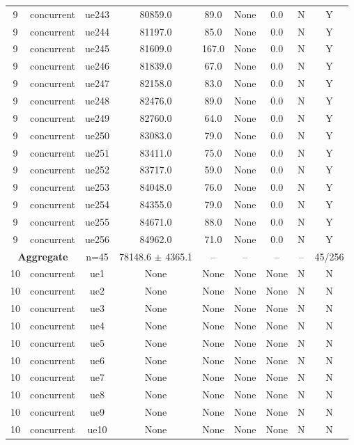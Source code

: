 \begin{table}[ht]
\begin{tabular}{|c|c|c|c|c|c|c|c|c|}
9 & concurrent & ue243 & 80859.0 & 89.0 & None & 0.0 & N & Y \\
9 & concurrent & ue244 & 81197.0 & 85.0 & None & 0.0 & N & Y \\
9 & concurrent & ue245 & 81609.0 & 167.0 & None & 0.0 & N & Y \\
9 & concurrent & ue246 & 81839.0 & 67.0 & None & 0.0 & N & Y \\
9 & concurrent & ue247 & 82158.0 & 83.0 & None & 0.0 & N & Y \\
9 & concurrent & ue248 & 82476.0 & 89.0 & None & 0.0 & N & Y \\
9 & concurrent & ue249 & 82760.0 & 64.0 & None & 0.0 & N & Y \\
9 & concurrent & ue250 & 83083.0 & 79.0 & None & 0.0 & N & Y \\
9 & concurrent & ue251 & 83411.0 & 75.0 & None & 0.0 & N & Y \\
9 & concurrent & ue252 & 83717.0 & 59.0 & None & 0.0 & N & Y \\
9 & concurrent & ue253 & 84048.0 & 76.0 & None & 0.0 & N & Y \\
9 & concurrent & ue254 & 84355.0 & 79.0 & None & 0.0 & N & Y \\
9 & concurrent & ue255 & 84671.0 & 88.0 & None & 0.0 & N & Y \\
9 & concurrent & ue256 & 84962.0 & 71.0 & None & 0.0 & N & Y \\
\multicolumn{2}{|c|}{\textbf{Aggregate}} & n=45 & 78148.6 $\pm$ 4365.1 & -- & -- & -- & -- & 45/256 \\
\hline
10 & concurrent & ue1 & None & None & None & None & N & N \\
10 & concurrent & ue2 & None & None & None & None & N & N \\
10 & concurrent & ue3 & None & None & None & None & N & N \\
10 & concurrent & ue4 & None & None & None & None & N & N \\
10 & concurrent & ue5 & None & None & None & None & N & N \\
10 & concurrent & ue6 & None & None & None & None & N & N \\
10 & concurrent & ue7 & None & None & None & None & N & N \\
10 & concurrent & ue8 & None & None & None & None & N & N \\
10 & concurrent & ue9 & None & None & None & None & N & N \\
10 & concurrent & ue10 & None & None & None & None & N & N \\

\end{tabular}
\end{table}
